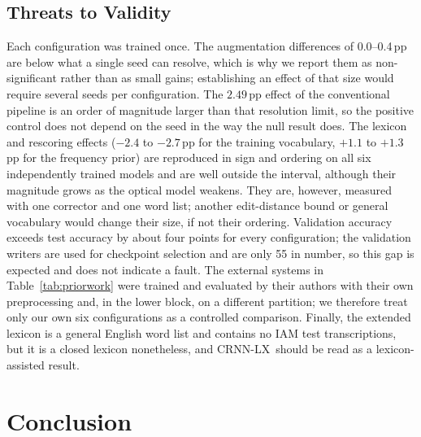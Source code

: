 \documentclass[conference]{IEEEtran}
\newcommand{\ours}{CRNN-LX}            %
\begin{document}
\subsection{Threats to Validity}

Each configuration was trained once. The augmentation differences of
0.0--0.4\,pp are below what a single seed can resolve, which is why we
report them as non-significant rather than as small gains; establishing
an effect of that size would require several seeds per configuration.
The $2.49$\,pp effect of the conventional pipeline is an order of
magnitude larger than that resolution limit, so the positive control
does not depend on the seed in the way the null result does.
The lexicon and rescoring effects ($-2.4$ to $-2.7$\,pp for the
training vocabulary, $+1.1$ to $+1.3$\,pp for the frequency prior) are
reproduced in sign and ordering on all six independently trained
models and are well outside the interval, although their magnitude
grows as the optical model weakens. They are, however, measured with one corrector
and one word list; another edit-distance bound or general vocabulary
would change their size, if not their ordering.
Validation accuracy exceeds test accuracy by about four points for
every configuration; the validation writers are used for checkpoint
selection and are only 55 in number, so this gap is expected and does
not indicate a fault. The external systems in Table~\ref{tab:priorwork}
were trained and evaluated by their authors with their own
preprocessing and, in the lower block, on a different partition; we
therefore treat only our own six configurations as a controlled
comparison. Finally, the extended lexicon is a general English word
list and contains no IAM test transcriptions, but it is a closed
lexicon nonetheless, and \ours\ should be read as a lexicon-assisted
result.

\section{Conclusion}
\label{sec:conclusion}
\end{document}

